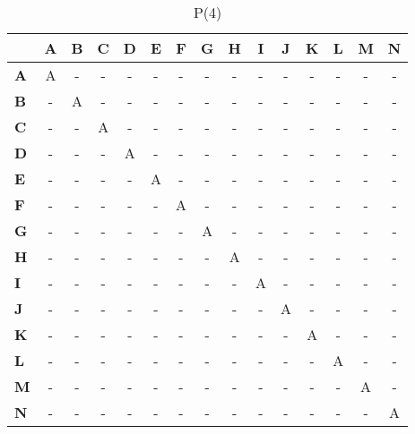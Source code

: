 \documentclass{article}
\begin{document}
\begin{table}[H]\centering
\caption{P(4)}
\begin{tabular}{l c c c c c c c c c c c c c c}
\toprule
 & \textbf{A} & \textbf{B} & \textbf{C} & \textbf{D} & \textbf{E} & \textbf{F} & \textbf{G} & \textbf{H} & \textbf{I} & \textbf{J} & \textbf{K} & \textbf{L} & \textbf{M} & \textbf{N}\\\midrule
\textbf{A} & A & - & - & - & - & - & - & - & - & - & - & - & - & - \\
\textbf{B} & - & A & - & - & - & - & - & - & - & - & - & - & - & - \\
\textbf{C} & - & - & A & - & - & - & - & - & - & - & - & - & - & - \\
\textbf{D} & - & - & - & A & - & - & - & - & - & - & - & - & - & - \\
\textbf{E} & - & - & - & - & A & - & - & - & - & - & - & - & - & - \\
\textbf{F} & - & - & - & - & - & A & - & - & - & - & - & - & - & - \\
\textbf{G} & - & - & - & - & - & - & A & - & - & - & - & - & - & - \\
\textbf{H} & - & - & - & - & - & - & - & A & - & - & - & - & - & - \\
\textbf{I} & - & - & - & - & - & - & - & - & A & - & - & - & - & - \\
\textbf{J} & - & - & - & - & - & - & - & - & - & A & - & - & - & - \\
\textbf{K} & - & - & - & - & - & - & - & - & - & - & A & - & - & - \\
\textbf{L} & - & - & - & - & - & - & - & - & - & - & - & A & - & - \\
\textbf{M} & - & - & - & - & - & - & - & - & - & - & - & - & A & - \\
\textbf{N} & - & - & - & - & - & - & - & - & - & - & - & - & - & A \\
\bottomrule
\end{tabular}
\end{table}
\end{document}
